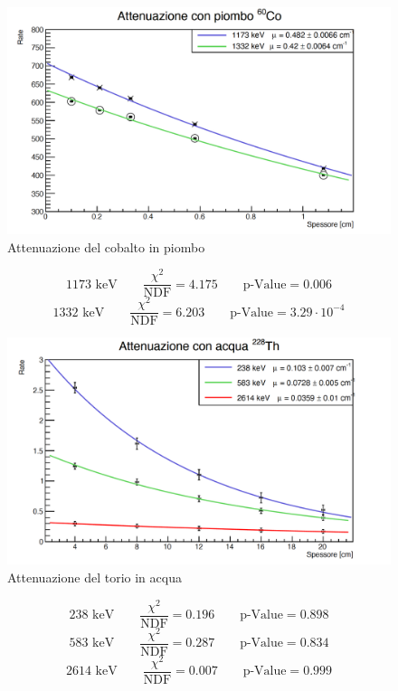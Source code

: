\documentclass[a4paper,10pt]{article}
\newcommand*{\unit}[1]{\ensuremath{\mathrm{\,#1}}}
\begin{document}
\begin{figure}[H]
    \centering
    \includegraphics[scale=0.45]{grafici/attenuazionecobaltopiombo}
    \caption{Attenuazione del cobalto in piombo}
\end{figure}
$$
	1173\, \unit{keV} \qquad \frac{\chi^2}{\textrm{NDF}}   = 4.175 \qquad \textrm{p-Value} = 0.006
$$
$$
	1332\, \unit{keV} \qquad \frac{\chi^2}{\textrm{NDF}}   = 6.203 \qquad \textrm{p-Value} = 3.29\cdot 10^{-4}
$$
\begin{figure}[H]
    \centering
    \includegraphics[scale=0.45]{grafici/attenuazionetorioacqua}
    \caption{Attenuazione del torio in acqua}
\end{figure}
$$
	238\, \unit{keV} \qquad \frac{\chi^2}{\textrm{NDF}}   = 0.196 \qquad \textrm{p-Value} = 0.898
$$
$$
	583\, \unit{keV} \qquad \frac{\chi^2}{\textrm{NDF}}   = 0.287 \qquad \textrm{p-Value} = 0.834
$$
$$
	2614\, \unit{keV} \qquad \frac{\chi^2}{\textrm{NDF}}   = 0.007 \qquad \textrm{p-Value} = 0.999
$$
\end{document}

